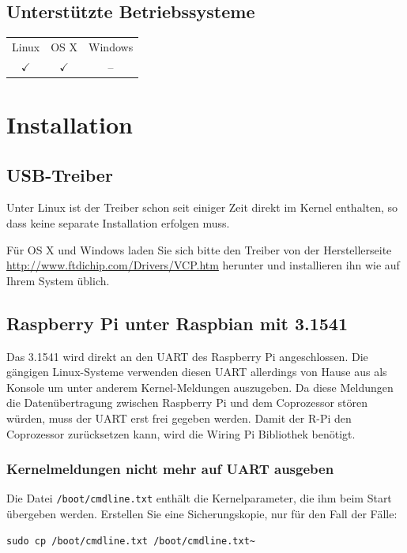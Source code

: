 \documentclass[10pt,a4paper]{scrartcl}		%
\begin{document}
\subsection{Unterstützte Betriebssysteme}
\begin{tabular}[c]{c c c}
\toprule
Linux & OS X & Windows \\
$\checkmark$ & $\checkmark$ & -- \\
\bottomrule
\end{tabular}

\section{Installation}
\subsection{USB-Treiber}
Unter Linux ist der Treiber schon seit einiger Zeit direkt im Kernel
enthalten, so dass keine separate Installation erfolgen muss.

Für OS X und Windows laden Sie sich bitte den Treiber von der
Herstellerseite \url{http://www.ftdichip.com/Drivers/VCP.htm} 
herunter und installieren ihn wie auf Ihrem System üblich.

\subsection{Raspberry Pi unter Raspbian mit 3.1541}
Das 3.1541 wird direkt an den UART des Raspberry Pi angeschlossen.
Die gängigen Linux-Systeme verwenden diesen UART allerdings von
Hause aus als Konsole um unter anderem Kernel-Meldungen auszugeben. 
Da diese Meldungen die Datenübertragung zwischen Raspberry Pi
und dem Coprozessor stören würden, muss der UART erst frei
gegeben werden. Damit der R-Pi den Coprozessor zurücksetzen kann,
wird die Wiring Pi Bibliothek benötigt.

\subsubsection*{Kernelmeldungen nicht mehr auf UART ausgeben}
Die Datei \texttt{/boot/cmdline.txt} enthält die Kernelparameter, die ihm
beim Start übergeben werden.  
Erstellen Sie eine Sicherungskopie, nur für den Fall der Fälle:

\begin{verbatim}
sudo cp /boot/cmdline.txt /boot/cmdline.txt~
\end{verbatim}
\end{document}
